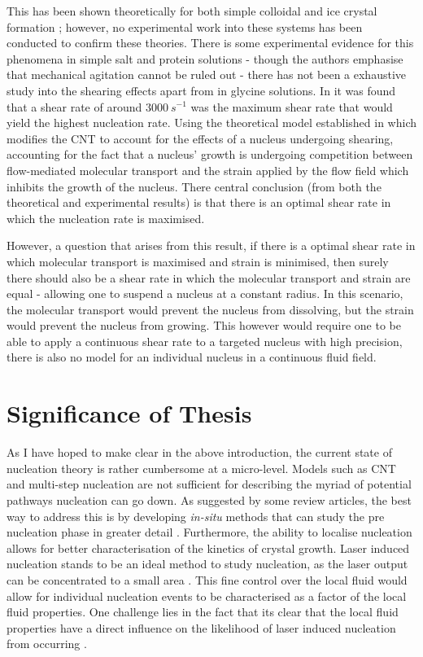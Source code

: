 This has been shown theoretically for both simple colloidal 
\cite{Mura2016,Debuysschere2023,Richard2015} and ice crystal 
formation \cite{Goswami2020}; however, no experimental work 
into these systems has been conducted to confirm these theories. 
There is some experimental evidence for this phenomena in simple 
salt and protein solutions - though the authors emphasise that 
mechanical agitation cannot be ruled out - there has not been a 
exhaustive study into the shearing effects apart from in glycine 
solutions. In \cite{Debuysschere2023} it was found that a shear 
rate of around $3000\ s^{-1}$ was the maximum shear rate that 
would yield the highest nucleation rate. Using the theoretical 
model established in \cite{Mura2016,2001} which modifies the CNT 
to account for the effects of a nucleus undergoing shearing, 
accounting for the fact that a nucleus' growth is undergoing 
competition between flow-mediated molecular transport and the 
strain applied by the flow field which inhibits the growth of 
the nucleus. There central conclusion (from both the theoretical 
and experimental results) is that there is an optimal shear rate 
in which the nucleation rate is maximised. 

However, a question that arises from this result, if there is 
a optimal shear rate in which molecular transport is maximised 
and strain is minimised, then surely there should also be a shear 
rate in which the molecular transport and strain are equal - 
allowing one to suspend a nucleus at a constant radius. In this 
scenario, the molecular transport would prevent the nucleus from 
dissolving, but the strain would prevent the nucleus from growing. 
This however would require one to be able to apply a continuous 
shear rate to a targeted nucleus with high precision, there is 
also no model for an individual nucleus in a continuous fluid 
field. 

\section{Significance of Thesis}
As I have hoped to make clear in the above introduction, the 
current state of nucleation theory is rather cumbersome at a 
micro-level. Models such as CNT and multi-step nucleation are 
not sufficient for describing the myriad of potential pathways 
nucleation can go down. As suggested by some review articles, 
the best way to address this is by developing \textit{in-situ} 
methods that can study the pre nucleation phase in greater detail 
\cite{Fu2021}. Furthermore, the ability to localise nucleation 
allows for better characterisation of the kinetics of crystal 
growth. Laser induced nucleation stands to be an ideal method to 
study nucleation, as the laser output can be concentrated to a 
small area \cite{Korede2023}. This fine control over the local 
fluid would allow for individual nucleation events to be
characterised as a factor of the local fluid properties. One 
challenge lies in the fact that its clear that the local fluid 
properties have a direct influence on the likelihood of laser
induced nucleation from occurring \cite{Korede2023, Ward2016,
Yuyama2012, Liao2022}. 

